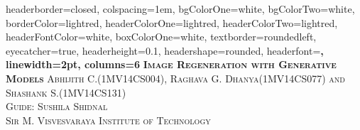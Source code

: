 \documentclass[a3paper,fontscale=.9]{baposter} %
\begin{document}
\begin{poster}
{
headerborder=closed, %
colspacing=1em, %
bgColorOne=white, %
bgColorTwo=white, %
borderColor=lightred, %
headerColorOne=lightred, %
headerColorTwo=lightred, %
headerFontColor=white, %
boxColorOne=white, %
textborder=roundedleft, %
eyecatcher=true, %
headerheight=0.1\textheight, %
headershape=rounded, %
headerfont=\Large\bf\textsc, %
linewidth=2pt, %
columns=6
}
%
{} %
{\bf\textsc{Image Regeneration with Generative Models}} %
{\textsc{ Abhijith C.(1MV14CS004), Raghava G. Dhanya(1MV14CS077) and Shashank S.(1MV14CS131)\\Guide: Sushila Shidnal\\ Sir M. Visvesvaraya Institute of Technology }} %
{}%




\end{poster}
\end{document}
